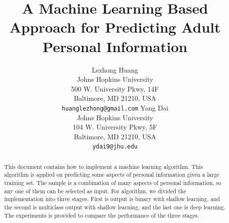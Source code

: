 \documentclass[11pt,letterpaper]{article}
\title{ A Machine Learning Based Approach for Predicting Adult Personal Information}
\author{Lezhong Huang\\
  Johns Hopkins University\\
  500 W. University Pkwy, 14F\\
  Baltimore, MD 21210, USA\\
  {\tt huanglezhong@gmail.com}
  \And
  Yang Dai \\
  Johns Hopkins University \\
  104 W. University Pkwy, 5F\\
  Baltimore, MD 21210, USA\\
  {\tt ydai9@jhu.edu}}
\date{}
\begin{document}
\maketitle
\begin{abstract}
This document contains how to implement a machine learning algorithm. This algorithm is applied on predicting some aspects of personal information given a large training set. The sample is a combination of many aspects of personal information, so any one of them can be selected as input. For algorithm, we divided the implementation into three stages. First is output is binary with shallow learning, and the second is multiclass output with shallow learning, and the last one is deep learning. The experiments is provided to compare the performance of the three stages.
\end{abstract}
\end{document}
